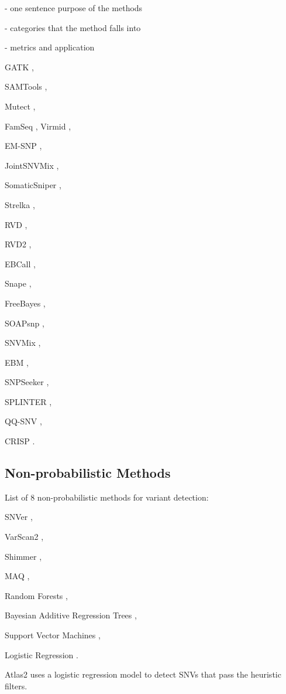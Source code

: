 \documentclass[11pt,reqno]{amsart}
\begin{document}
- one sentence purpose of the methods

- categories that the method falls into

- metrics and application

GATK \citep{McKenna2010},



SAMTools \citep{Li2009a},

Mutect \citep{Cibulskis2013},

FamSeq \citep{Peng2013},
Virmid \citep{Kim2013},

EM-SNP \citep{Chen2013},

JointSNVMix \citep{Roth2012},

SomaticSniper \citep{Larson2012},

Strelka \citep{Saunders2012},

RVD \citep{Flaherty2012},

RVD2 \citep{He2015},

EBCall \citep{Shiraishi2013},

Snape \citep{Raineri2012},

FreeBayes \citep{Garrison2012},

SOAPsnp \citep{Li2009},

SNVMix \citep{Goya2010},

EBM \citep{Zhou2012},

SNPSeeker \citep{Druley2009},

SPLINTER \citep{Spencer2014},

QQ-SNV \citep{VanderBorght2015},

CRISP \citep{Bansal2010}.

\subsection{Non-probabilistic Methods}
List of 8 non-probabilistic methods for variant detection:

SNVer \citep{Wei2011},

VarScan2 \citep{Koboldt2012},

Shimmer \citep{Hansen2013},

MAQ \citep{Li2008},

Random Forests \citep{Ding2012},

Bayesian Additive Regression Trees \citep{Ding2012},

Support Vector Machines \citep{Ding2012},

Logistic Regression \citep{Ding2012}.

Atlas2 \citep{challis2012integrative} uses a logistic regression model to detect SNVs that pass the heuristic filters.




\end{document}
